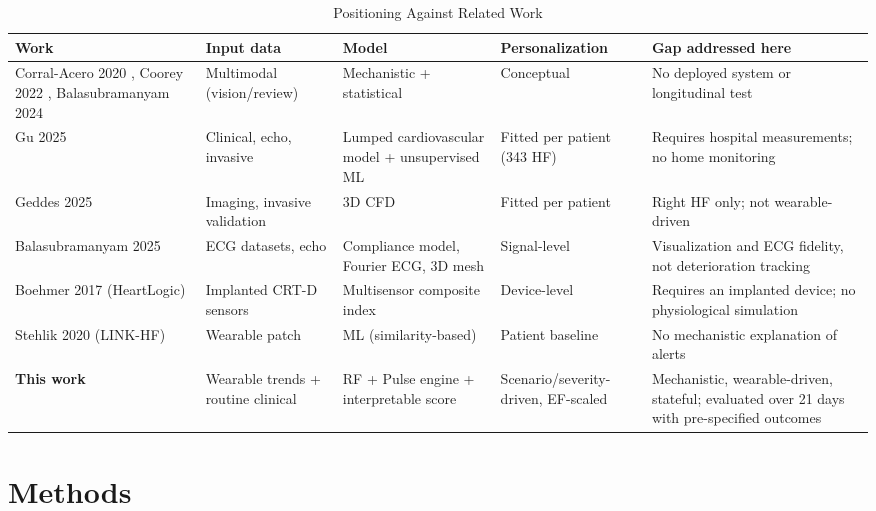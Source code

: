 \documentclass[conference]{IEEEtran}
\begin{document}
\begin{table}[!t]
\centering
\caption{Positioning Against Related Work}
\label{tab:related}
\footnotesize
\begin{tabularx}{\textwidth}{@{}P{2.6cm}P{2.7cm}P{3.0cm}P{2.9cm}Y@{}}
\toprule
\textbf{Work} & \textbf{Input data} & \textbf{Model} & \textbf{Personalization} & \textbf{Gap addressed here} \\
\midrule
Corral-Acero 2020 \cite{corral2020twin}, Coorey 2022 \cite{coorey2022twin}, Balasubramanyam 2024 \cite{balasubramanyam2024review} & Multimodal (vision/review) & Mechanistic + statistical & Conceptual & No deployed system or longitudinal test \\
Gu 2025 \cite{gu2025hftwin} & Clinical, echo, invasive & Lumped cardiovascular model + unsupervised ML & Fitted per patient (343 HF) & Requires hospital measurements; no home monitoring \\
Geddes 2025 \cite{geddes2025rhftwin} & Imaging, invasive validation & 3D CFD & Fitted per patient & Right HF only; not wearable-driven \\
Balasubramanyam 2025 \cite{balasubramanyam2025twin} & ECG datasets, echo & Compliance model, Fourier ECG, 3D mesh & Signal-level & Visualization and ECG fidelity, not deterioration tracking \\
Boehmer 2017 (HeartLogic) \cite{boehmer2017multisense} & Implanted CRT-D sensors & Multisensor composite index & Device-level & Requires an implanted device; no physiological simulation \\
Stehlik 2020 (LINK-HF) \cite{stehlik2020linkhf} & Wearable patch & ML (similarity-based) & Patient baseline & No mechanistic explanation of alerts \\
\textbf{This work} & Wearable trends + routine clinical & RF + Pulse engine + interpretable score & Scenario/severity-driven, EF-scaled & Mechanistic, wearable-driven, stateful; evaluated over 21 days with pre-specified outcomes \\
\bottomrule
\end{tabularx}
\end{table}

\section{Methods}\label{sec:methods}
\end{document}
